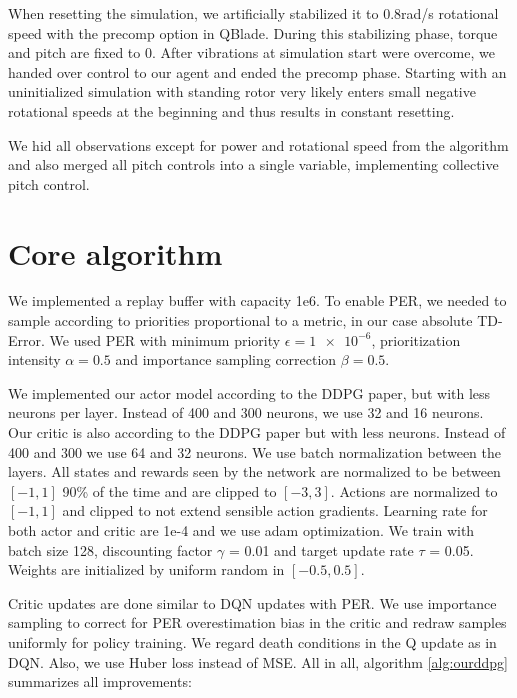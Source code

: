 \documentclass[hyperref,final,beleg]{cgvpub}
\begin{document}
When resetting the simulation, we artificially stabilized it to 0.8rad/s rotational speed with the precomp option in QBlade. During this stabilizing phase, torque and pitch are fixed to 0. After vibrations at simulation start were overcome, we handed over control to our agent and ended the precomp phase. Starting with an uninitialized simulation with standing rotor very likely enters small negative rotational speeds at the beginning and thus results in constant resetting.

We hid all observations except for power and rotational speed from the algorithm and also merged all pitch controls into a single variable, implementing collective pitch control.

\section{Core algorithm}

We implemented a replay buffer with capacity 1e6. To enable \ac{PER}, we needed to sample according to priorities proportional to a metric, in our case absolute \ac{TD-Error}. We used \ac{PER} with minimum priority $\epsilon = \num{1e-6}$, prioritization intensity $\alpha = 0.5$ and importance sampling correction $\beta = 0.5$. 

We implemented our actor model according to the \ac{DDPG} paper, but with less neurons per layer. Instead of 400 and 300 neurons, we use 32 and 16 neurons. Our critic is also according to the \ac{DDPG} paper but with less neurons. Instead of 400 and 300 we use 64 and 32 neurons. We use batch normalization between the layers. All states and rewards seen by the network are normalized to be between $[-1, 1]$ 90\% of the time and are clipped to $[-3, 3]$. Actions are normalized to $[-1, 1]$ and clipped to not extend sensible action gradients. Learning rate for both actor and critic are 1e-4 and we use adam optimization. We train with batch size 128, discounting factor $\gamma$ = 0.01 and target update rate $\tau$ = 0.05. Weights are initialized by uniform random in $[-0.5, 0.5]$.

Critic updates are done similar to \ac{DQN} updates with \ac{PER}. We use importance sampling to correct for \ac{PER} overestimation bias in the critic and redraw samples uniformly for policy training. We regard death conditions in the Q update as in \ac{DQN}. Also, we use Huber loss instead of MSE. All in all, algorithm \ref{alg:ourddpg} summarizes all improvements:
\end{document}
